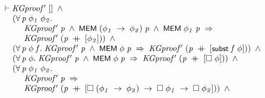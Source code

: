 \documentclass[letterpaper]{article}
\renewcommand{\HOLConst}[1]{{\textsf{\upshape\small #1}}}
\newenvironment{holmath}{\begin{displaymath}\begin{array}{l}}{\end{array}\end{displaymath}\ignorespacesafterend}
\begin{document}
\begin{holmath}
  \ensuremath{\HOLTokenTurnstile}\HOLFreeVar{KGproof\sp{\prime}}\;[]\;\HOLSymConst{\HOLTokenConj{}}\\
\;\;\;\;\;(\HOLSymConst{\HOLTokenForall{}}\HOLBoundVar{p}\;\HOLBoundVar{\ensuremath{\phi\sb{1}}}\;\HOLBoundVar{\ensuremath{\phi\sb{2}}}.\\
\;\;\;\;\;\;\;\;\;\;\HOLFreeVar{KGproof\sp{\prime}}\;\HOLBoundVar{p}\;\HOLSymConst{\HOLTokenConj{}}\;\HOLConst{MEM}\;(\HOLBoundVar{\ensuremath{\phi\sb{1}}}\;\HOLSymConst{\ensuremath{\rightarrow}}\;\HOLBoundVar{\ensuremath{\phi\sb{2}}})\;\HOLBoundVar{p}\;\HOLSymConst{\HOLTokenConj{}}\;\HOLConst{MEM}\;\HOLBoundVar{\ensuremath{\phi\sb{1}}}\;\HOLBoundVar{p}\;\HOLSymConst{\HOLTokenImp{}}\\
\;\;\;\;\;\;\;\;\;\;\HOLFreeVar{KGproof\sp{\prime}}\;(\HOLBoundVar{p}\;\HOLSymConst{\HOLTokenDoublePlus}\;[\HOLBoundVar{\ensuremath{\phi\sb{2}}}]))\;\HOLSymConst{\HOLTokenConj{}}\\
\;\;\;\;\;(\HOLSymConst{\HOLTokenForall{}}\HOLBoundVar{p}\;\HOLBoundVar{\ensuremath{\phi}}\;\HOLBoundVar{f}.\;\HOLFreeVar{KGproof\sp{\prime}}\;\HOLBoundVar{p}\;\HOLSymConst{\HOLTokenConj{}}\;\HOLConst{MEM}\;\HOLBoundVar{\ensuremath{\phi}}\;\HOLBoundVar{p}\;\HOLSymConst{\HOLTokenImp{}}\;\HOLFreeVar{KGproof\sp{\prime}}\;(\HOLBoundVar{p}\;\HOLSymConst{\HOLTokenDoublePlus}\;[\HOLConst{subst}\;\HOLBoundVar{f}\;\HOLBoundVar{\ensuremath{\phi}}]))\;\HOLSymConst{\HOLTokenConj{}}\\
\;\;\;\;\;(\HOLSymConst{\HOLTokenForall{}}\HOLBoundVar{p}\;\HOLBoundVar{\ensuremath{\phi}}.\;\HOLFreeVar{KGproof\sp{\prime}}\;\HOLBoundVar{p}\;\HOLSymConst{\HOLTokenConj{}}\;\HOLConst{MEM}\;\HOLBoundVar{\ensuremath{\phi}}\;\HOLBoundVar{p}\;\HOLSymConst{\HOLTokenImp{}}\;\HOLFreeVar{KGproof\sp{\prime}}\;(\HOLBoundVar{p}\;\HOLSymConst{\HOLTokenDoublePlus}\;[\HOLSymConst{\ensuremath{\Box}}\;\HOLBoundVar{\ensuremath{\phi}}]))\;\HOLSymConst{\HOLTokenConj{}}\\
\;\;\;\;\;(\HOLSymConst{\HOLTokenForall{}}\HOLBoundVar{p}\;\HOLBoundVar{\ensuremath{\phi\sb{1}}}\;\HOLBoundVar{\ensuremath{\phi\sb{2}}}.\\
\;\;\;\;\;\;\;\;\;\;\HOLFreeVar{KGproof\sp{\prime}}\;\HOLBoundVar{p}\;\HOLSymConst{\HOLTokenImp{}}\\
\;\;\;\;\;\;\;\;\;\;\HOLFreeVar{KGproof\sp{\prime}}\;(\HOLBoundVar{p}\;\HOLSymConst{\HOLTokenDoublePlus}\;[\HOLSymConst{\ensuremath{\Box}}\;(\HOLBoundVar{\ensuremath{\phi\sb{1}}}\;\HOLSymConst{\ensuremath{\rightarrow}}\;\HOLBoundVar{\ensuremath{\phi\sb{2}}})\;\HOLSymConst{\ensuremath{\rightarrow}}\;\HOLSymConst{\ensuremath{\Box}}\;\HOLBoundVar{\ensuremath{\phi\sb{1}}}\;\HOLSymConst{\ensuremath{\rightarrow}}\;\HOLSymConst{\ensuremath{\Box}}\;\HOLBoundVar{\ensuremath{\phi\sb{2}}}]))\;\HOLSymConst{\HOLTokenConj{}}\\

\end{holmath}
\end{document}

